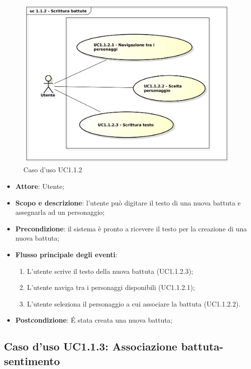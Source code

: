 \begin{figure}[htbp]
\centering
\includegraphics[scale=0.5]{UseCase_17_03_2016/immagini/uc_1_1_2_scrittura_battute.png}
\captionsetup{labelfont=bf}
\caption{Caso d'uso UC1.1.2}
\end{figure}

\begin{itemize}
\item \textbf{Attore}: Utente;
\item \textbf{Scopo e descrizione}: l'utente può digitare il testo di una nuova battuta e assegnarla ad un personaggio;
\item \textbf{Precondizione}: il sistema è pronto a ricevere il testo per la creazione di una nuova battuta;
\item \textbf{Flusso principale degli eventi}:
\begin{enumerate}
\item L'utente scrive il testo della nuova battuta (UC1.1.2.3);
\item L'utente naviga tra i personaggi disponibili (UC1.1.2.1);
\item L'utente seleziona il personaggio a cui associare la battuta (UC1.1.2.2).
\end{enumerate} 
\item \textbf{Postcondizione}: \'E stata creata una nuova battuta;
\end{itemize}

\subsection{Caso d'uso UC1.1.3: Associazione battuta-sentimento}

